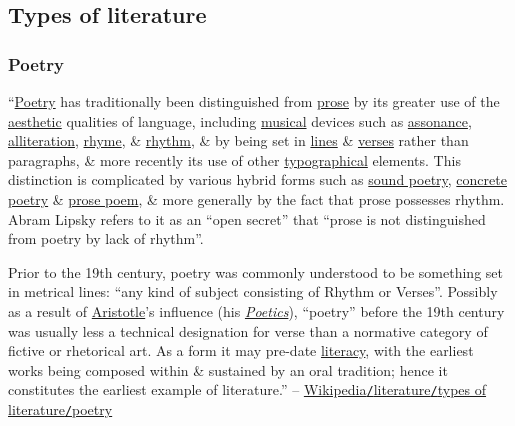 \documentclass[oneside]{book}
\numberwithin{equation}{section}
\begin{document}
\subsection{Types of literature}

\subsubsection{Poetry}
``\href{https://en.wikipedia.org/wiki/Poetry}{Poetry} has traditionally been distinguished from \href{https://en.wikipedia.org/wiki/Prose}{prose} by its greater use of the \href{https://en.wikipedia.org/wiki/Aesthetics}{aesthetic} qualities of language, including \href{https://en.wikipedia.org/wiki/Music}{musical} devices such as \href{https://en.wikipedia.org/wiki/Assonance}{assonance}, \href{https://en.wikipedia.org/wiki/Alliteration}{alliteration}, \href{https://en.wikipedia.org/wiki/Rhyme}{rhyme}, \& \href{https://en.wikipedia.org/wiki/Rhythm}{rhythm}, \& by being set in \href{https://en.wikipedia.org/wiki/Line_(poetry)}{lines} \& \href{https://en.wikipedia.org/wiki/Verse_(poetry)}{verses} rather than paragraphs, \& more recently its use of other \href{https://en.wikipedia.org/wiki/Typography}{typographical} elements. This distinction is complicated by various hybrid forms such as \href{https://en.wikipedia.org/wiki/Sound_poetry}{sound poetry}, \href{https://en.wikipedia.org/wiki/Concrete_poetry}{concrete poetry} \& \href{https://en.wikipedia.org/wiki/Prose_poem}{prose poem}, \& more generally by the fact that prose possesses rhythm. Abram Lipsky refers to it as an ``open secret'' that ``prose is not distinguished from poetry by lack of rhythm''.

Prior to the 19th century, poetry was commonly understood to be something set in metrical lines: ``any kind of subject consisting of Rhythm or Verses''. Possibly as a result of \href{https://en.wikipedia.org/wiki/Aristotle}{Aristotle}'s influence (his \href{https://en.wikipedia.org/wiki/Poetics_(Aristotle)}{\textit{Poetics}}), ``poetry'' before the 19th century was usually less a technical designation for verse than a normative category of fictive or rhetorical art. As a form it may pre-date \href{https://en.wikipedia.org/wiki/Literacy}{literacy}, with the earliest works being composed within \& sustained by an oral tradition; hence it constitutes the earliest example of literature.'' -- \href{https://en.wikipedia.org/wiki/Literature#Poetry}{Wikipedia\texttt{/}literature\texttt{/}types of literature\texttt{/}poetry}
\end{document}
